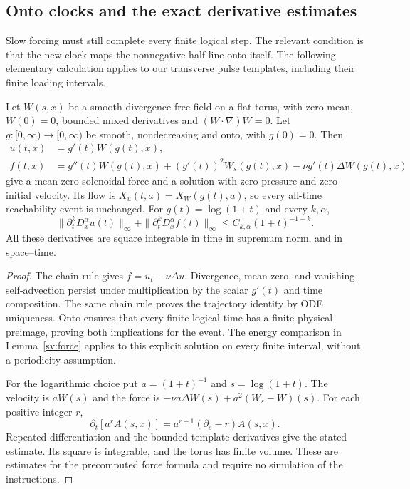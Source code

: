 \subsection{Onto clocks and the exact derivative estimates}
\label{bcs:clocks-section}
Slow forcing must still complete every finite logical step.  The relevant
condition is that the new clock maps the nonnegative half-line onto itself.
The following elementary calculation applies to our transverse pulse
templates, including their finite loading intervals.

\begin{lemma}\label{bcs:clock}
Let $W(s,x)$ be a smooth divergence-free field on a flat torus, with
zero mean, $W(0)=0$, bounded mixed derivatives and
$(W\cdot\nabla)W=0$.  Let $g:[0,\infty)\to[0,\infty)$ be
smooth, nondecreasing and onto, with $g(0)=0$.  Then
\begin{align*}
 u(t,x)&=g'(t)W(g(t),x),\\
 f(t,x)&=g''(t)W(g(t),x)+(g'(t))^2W_s(g(t),x)
                         -\nu g'(t)\Delta W(g(t),x)
\end{align*}
give a mean-zero solenoidal force and a solution with zero pressure and
zero initial velocity.  Its flow is $X_u(t,a)=X_W(g(t),a)$, so every
all-time reachability event is unchanged.  For $g(t)=\log(1+t)$ and
every $k,\alpha$,
\[
 \|\partial_t^kD_x^\alpha u(t)\|_\infty+
 \|\partial_t^kD_x^\alpha f(t)\|_\infty
 \le C_{k,\alpha}(1+t)^{-1-k}.
\]
All these derivatives are square integrable in time in supremum norm,
and in space--time.
\end{lemma}
\begin{proof}
The chain rule gives $f=u_t-\nu\Delta u$.  Divergence, mean zero,
and vanishing self-advection persist under multiplication by the scalar
$g'(t)$ and time composition.  The same chain rule proves the trajectory
identity by ODE uniqueness.  Onto ensures that every finite logical time
has a finite physical preimage, proving both implications for the event.
The energy comparison in Lemma~\ref{sv:force} applies to this explicit
solution on every finite interval, without a periodicity assumption.

For the logarithmic choice put $a=(1+t)^{-1}$ and $s=\log(1+t)$.
The velocity is $aW(s)$ and the force is
$-\nu a\Delta W(s)+a^2(W_s-W)(s)$.
For each positive integer $r$,
\[
 \partial_t[a^rA(s,x)]=a^{r+1}(\partial_s-r)A(s,x).
\]
Repeated differentiation and the bounded template derivatives give the
stated estimate.  Its square is integrable, and the torus has finite
volume.  These are estimates for the precomputed force formula and
require no simulation of the instructions.
\end{proof}

